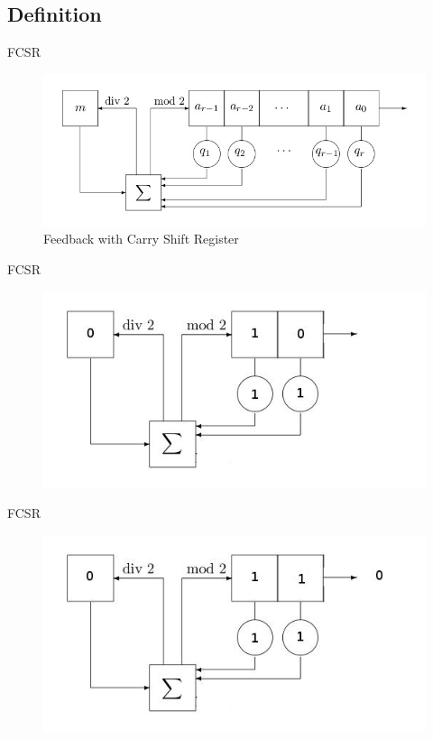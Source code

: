 \documentclass{beamer}
\begin{document}
\subsection{Definition}
\begin{frame}{FCSR}
  \begin{figure}[h!]
    \centering
    \includegraphics[totalheight=0.5\textheight]{fcsr.jpg}
    \caption{Feedback with Carry Shift Register}
  \end{figure}
\end{frame}
\begin{frame}{FCSR}
  \begin{figure}[h!]
    \centering
    \includegraphics[totalheight=0.5\textheight]{small-fcsr-1.jpg}
  \end{figure}
\end{frame}
\begin{frame}{FCSR}
  \begin{figure}[h!]
    \centering
    \includegraphics[totalheight=0.5\textheight]{small-fcsr-2.jpg}
  \end{figure}
\end{frame}
\end{document}
